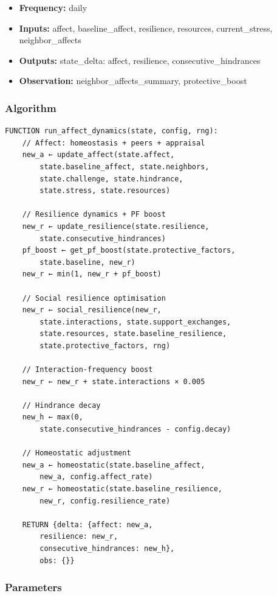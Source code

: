 \documentclass[
  letterpaper,
  DIV=11,
  numbers=noendperiod]{scrartcl}
\providecommand{\tightlist}{%
  \setlength{\itemsep}{0pt}\setlength{\parskip}{0pt}}
\begin{document}
\begin{itemize}
\tightlist
\item
  \textbf{Frequency:} daily
\item
  \textbf{Inputs:} affect, baseline\_affect, resilience, resources,
  current\_stress, neighbor\_affects
\item
  \textbf{Outputs:} state\_delta: affect, resilience,
  consecutive\_hindrances
\item
  \textbf{Observation:} neighbor\_affects\_summary, protective\_boost
\end{itemize}

\subsubsection{Algorithm}\label{algorithm-6}

\begin{verbatim}
FUNCTION run_affect_dynamics(state, config, rng):
    // Affect: homeostasis + peers + appraisal
    new_a ← update_affect(state.affect,
        state.baseline_affect, state.neighbors,
        state.challenge, state.hindrance,
        state.stress, state.resources)

    // Resilience dynamics + PF boost
    new_r ← update_resilience(state.resilience,
        state.consecutive_hindrances)
    pf_boost ← get_pf_boost(state.protective_factors,
        state.baseline, new_r)
    new_r ← min(1, new_r + pf_boost)

    // Social resilience optimisation
    new_r ← social_resilience(new_r,
        state.interactions, state.support_exchanges,
        state.resources, state.baseline_resilience,
        state.protective_factors, rng)

    // Interaction-frequency boost
    new_r ← new_r + state.interactions × 0.005

    // Hindrance decay
    new_h ← max(0,
        state.consecutive_hindrances - config.decay)

    // Homeostatic adjustment
    new_a ← homeostatic(state.baseline_affect,
        new_a, config.affect_rate)
    new_r ← homeostatic(state.baseline_resilience,
        new_r, config.resilience_rate)

    RETURN {delta: {affect: new_a,
        resilience: new_r,
        consecutive_hindrances: new_h},
        obs: {}}
\end{verbatim}

\subsubsection{Parameters}\label{parameters-6}
\end{document}

